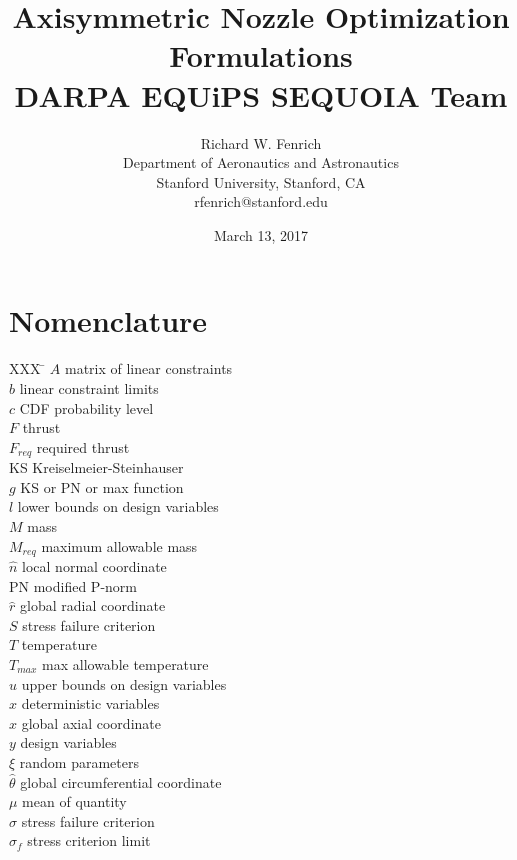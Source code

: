 \documentclass{article}
\title{Axisymmetric Nozzle Optimization Formulations\\DARPA EQUiPS SEQUOIA Team}
\author{Richard W. Fenrich\\Department of Aeronautics and Astronautics\\Stanford University, Stanford, CA\\rfenrich@stanford.edu}
\date{March 13, 2017}
\begin{document}
\maketitle

\tableofcontents

\listoftables


\section*{Nomenclature}

\begin{multicols}{2}
\begin{tabbing}
  XXX \= \kill%
  $A$ \> matrix of linear constraints \\
  $b$ \> linear constraint limits \\
  $c$ \> CDF probability level \\
  $F$ \> thrust \\
  $F_{req}$ \> required thrust \\
  KS \> Kreiselmeier-Steinhauser \\
  $g$ \> KS or PN or max function \\
  $l$ \> lower bounds on design variables \\
  $M$ \> mass \\
  $M_{req}$ \> maximum allowable mass \\
  $\hat{n}$ \> local normal coordinate \\
  PN \> modified P-norm \\ [\fill\columnbreak]
  $\hat{r}$ \> global radial coordinate \\
  $S$ \> stress failure criterion \\
  $T$ \> temperature \\
  $T_{max}$ \> max allowable temperature \\
  $u$ \> upper bounds on design variables \\
  $x$ \> deterministic variables \\
  $\hat{x}$ \> global axial coordinate \\
  $y$ \> design variables \\
  $\xi$ \> random parameters \\
  $\hat{\theta}$ \> global circumferential coordinate \\
  $\mu$ \> mean of quantity \\
  $\sigma$ \> stress failure criterion \\
  $\sigma_f$ \> stress criterion limit \\
 \end{tabbing}
\end{multicols}
\end{document}
